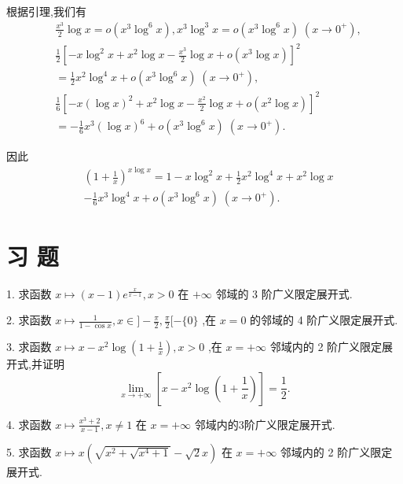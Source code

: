 根据引理,我们有
\begin{align*}
	&\frac{{x}^{3}}{2}\log x = o\left( {{x}^{3}{\log }^{6}x}\right) ,{x}^{3}{\log }^{3}x = o\left( {{x}^{3}{\log }^{6}x}\right) \;\left( {x \rightarrow  {0}^{ + }}\right) ,\\
	&\frac{1}{2}{\left\lbrack  -x{\log }^{2}x + {x}^{2}\log x - \frac{{x}^{3}}{2}\log x + o\left( {x}^{3}\log x\right) \right\rbrack  }^{2}\\
	&= \frac{1}{2}{x}^{2}{\log }^{4}x + o\left( {{x}^{3}{\log }^{6}x}\right) \;\left( {x \rightarrow  {0}^{ + }}\right) ,\\
	&\frac{1}{6}{\left\lbrack  -x{\left( \log x\right) }^{2} + {x}^{2}\log x - \frac{{x}^{2}}{2}\log x + o\left( {x}^{2}\log x\right) \right\rbrack  }^{2}\\
	&=  - \frac{1}{6}{x}^{3}{\left( \log x\right) }^{6} + o\left( {{x}^{3}{\log }^{6}x}\right) \;\left( {x \rightarrow  {0}^{ + }}\right) .
\end{align*}

因此
\begin{align*}
	&{\left( 1 + \frac{1}{x}\right) }^{x\log x} = 1 - x{\log }^{2}x + \frac{1}{2}{x}^{2}{\log }^{4}x + {x}^{2}\log x\\
	&- \frac{1}{6}{x}^{3}{\log }^{4}x + o\left( {{x}^{3}{\log }^{6}x}\right) \;\left( {x \rightarrow  {0}^{ + }}\right) .
\end{align*}

\section*{习 题}

1. 求函数 $x \mapsto  \left( {x - 1}\right) {e}^{\frac{x}{x - 1}},x > 0$ 在 $+ \infty$ 邻域的 3 阶广义限定展开式.

2. 求函数 $x \mapsto  \frac{1}{1 - \cos x},x \in  \rbrack  - \frac{\pi }{2},\frac{\pi }{2}\lbrack  - \{ 0\}$ ,在 $x = 0$ 的邻域的 4 阶广义限定展开式.

3. 求函数 $x \mapsto  x - {x}^{2}\log \left( {1 + \frac{1}{x}}\right) ,x > 0$ ,在 $x =  + \infty$ 邻域内的 2 阶广义限定展开式,并证明
$$\mathop{\lim }\limits_{{x \rightarrow   + \infty }}\left\lbrack  {x - {x}^{2}\log \left( {1 + \frac{1}{x}}\right) }\right\rbrack   = \frac{1}{2}.$$

4. 求函数 $x \mapsto  \frac{{x}^{3} + 2}{x - 1},x \neq  1$ 在 $x =  + \infty$ 邻域内的3阶广义限定展开式.

5. 求函数 $x \mapsto  x\left( {\sqrt{{x}^{2} + \sqrt{{x}^{4} + 1}} - \sqrt{2}x}\right)$ 在 $x =  + \infty$ 邻域内的 2 阶广义限定展开式.

